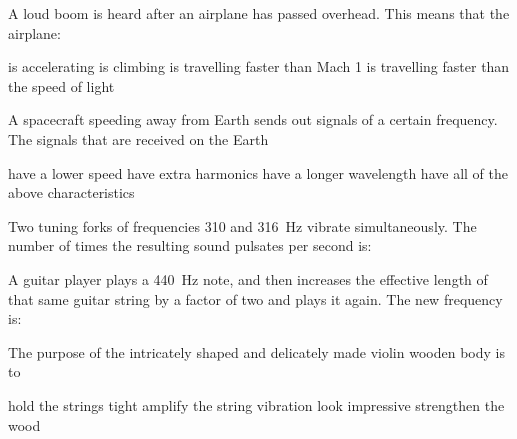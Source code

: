 \documentclass{../oss-apphys-exam}
\begin{document}
\begin{questions}
  
  \question A loud boom is heard after an airplane has passed overhead. This
  means that the airplane:
  \begin{choices}
    \choice is accelerating
    \choice is climbing
    \choice is travelling faster than Mach 1
    \choice is travelling faster than the speed of light
  \end{choices}
  
  \question A spacecraft speeding away from Earth sends out signals of a certain
  frequency. The signals that are received on the Earth
  \begin{choices}
    \choice have a lower speed
    \choice have extra harmonics
    \choice have a longer wavelength
    \choice have all of the above characteristics
  \end{choices}
  \newpage
  
  \question Two tuning forks of frequencies \num{310} and \SI{316}{\hertz}
  vibrate simultaneously. The number of times the resulting sound pulsates per
  second is:
  \begin{choices}
  \end{choices}


  \question A guitar player plays a \SI{440}{\hertz} note, and then increases
  the effective length of that same guitar string by a factor of two and plays
  it again. The new frequency is:

  \question The purpose of the intricately shaped and delicately made violin
  wooden body is to
  \begin{choices}
    \choice hold the strings tight
    \choice amplify the string vibration
    \choice look impressive
    \choice strengthen the wood
  \end{choices}
  

\end{questions}
\end{document}
